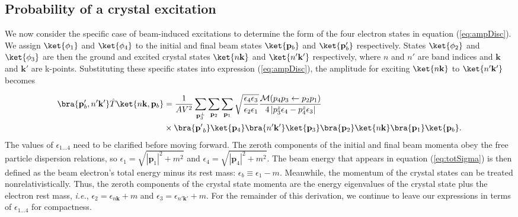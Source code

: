 \documentclass{article}
\begin{document}
\subsection{Probability of a crystal excitation} 
\label{sec:crystal}

We now consider the specific case of beam-induced excitations to determine the
form of the four electron states in equation (\ref{eq:ampDisc}).  We assign
$\ket{\phi_1}$ and $\ket{\phi_4}$ to the initial and final beam states
$\ket{\mathbf{p}_b}$ and $\ket{\mathbf{p}_b'}$ respectively.  States $\ket{\phi_2}$ and
$\ket{\phi_3}$ are then the ground and excited crystal states
$\ket{n\mathbf{k}}$ and $\ket{n'\mathbf{k'}}$ respectively, where $n$ and $n'$
are band indices and $\mathbf{k}$ and $\mathbf{k'}$ are k-points.
Substituting these specific states into expression (\ref{eq:ampDisc}), the
amplitude for exciting $\ket{n\mathbf{k}}$ to $\ket{n'\mathbf{k'}}$ becomes

\begin{equation} 
  \label{eq:ampCrystal} 
  \begin{aligned}
    \bra{\mathbf{p}_b', n'\mathbf{k'}} \hat{T} \ket{n\mathbf{k},\mathbf{p}_b}
    &=
    \frac{1}{AV^2}
    \sum_{\mathbf{p}_3^\perp} \sum_{\mathbf{p}_2} \sum_{\mathbf{p}_1}
    \sqrt{\frac{\epsilon_4\epsilon_3}{\epsilon_2\epsilon_1}}
    \frac{\mathcal{M}(p_4p_3\leftarrow p_2p_1)}
    {4\left|p_3^z\epsilon_4 - p_4^z\epsilon_3\right|}
    \\&\times
    \bra{\mathbf{p'}_b}\ket{\mathbf{p}_4}
    \bra{n'\mathbf{k'}}\ket{\mathbf{p}_3}
    \bra{\mathbf{p}_2}\ket{n\mathbf{k}}
    \bra{\mathbf{p}_1}\ket{\mathbf{p}_b}.
  \end{aligned}
\end{equation}
%
The values of $\epsilon_{1\dots4}$ need to be clarified before moving forward.
The zeroth components of the initial and final beam momenta obey the free
particle dispersion relations, so 
$\epsilon_1 = \sqrt{|\mathbf{p}_1|^2 + m^2}$
and
$\epsilon_4 = \sqrt{|\mathbf{p}_4|^2 + m^2}$.
The beam energy that appears in equation (\ref{eq:totSigma}) is then
defined as the beam electron's total energy minus its rest mass:
$\epsilon_b\equiv\epsilon_1 - m$.
Meanwhile, the momentum of the crystal states can be treated
nonrelativistically.
Thus, the zeroth components of the crystal state momenta
are the energy eigenvalues of the crystal state plus the electron rest mass,
\textit{i.e.},
$\epsilon_2=\epsilon_{n\mathbf{k}} + m$
and
$\epsilon_3=\epsilon_{n'\mathbf{k'}} + m$.
For the remainder of this derivation, we continue to leave our expressions
in terms of $\epsilon_{1\dots4}$ for compactness.
\end{document}
